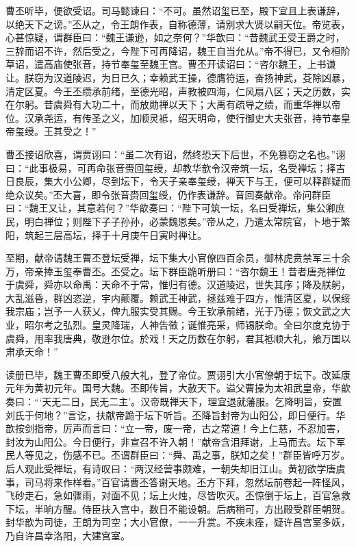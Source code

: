 曹丕听毕，便欲受诏。司马懿谏曰：“不可。虽然诏玺已至，殿下宜且上表谦辞，以绝天下之谤。”丕从之，令王朗作表，自称德薄，请别求大贤以嗣天位。帝览表，心甚惊疑，谓群臣曰：“魏王谦逊，如之奈何？”华歆曰：“昔魏武王受王爵之时，三辞而诏不许，然后受之，今陛下可再降诏，魏王自当允从。”帝不得已，又令桓阶草诏，遣高庙使张音，持节奉玺至魏王宫。曹丕开读诏曰：“咨尔魏王，上书谦让。朕窃为汉道陵迟，为日已久；幸赖武王操，德膺符运，奋扬神武，芟除凶暴，清定区夏。今王丕缵承前绪，至德光昭，声教被四海，仁风扇八区；天之历数，实在尔躬。昔虞舜有大功二十，而放勋禅以天下；大禹有疏导之绩，而重华禅以帝位。汉承尧运，有传圣之义，加顺灵袛，绍天明命，使行御史大夫张音，持节奉皇帝玺绶。王其受之！”

曹丕接诏欣喜，谓贾诩曰：“虽二次有诏，然终恐天下后世，不免篡窃之名也。”诩曰：“此事极易，可再命张音赍回玺绶，却教华歆令汉帝筑一坛，名受禅坛；择吉日良辰，集大小公卿，尽到坛下，令天子亲奉玺绶，禅天下与王，便可以释群疑而绝众议矣。”丕大喜，即令张音赍回玺绶，仍作表谦辞。音回奏献帝。帝问群臣曰：“魏王又让，其意若何？”华歆奏曰：“陛下可筑一坛，名曰受禅坛，集公卿庶民，明白禅位；则陛下子子孙孙，必蒙魏恩矣。”帝从之，乃遣太常院官，卜地于繁阳，筑起三层高坛，择于十月庚午日寅时禅让。

至期，献帝请魏王曹丕登坛受禅，坛下集大小官僚四百余员，御林虎贲禁军三十余万，帝亲捧玉玺奉曹丕。丕受之。坛下群臣跪听册曰：“咨尔魏王！昔者唐尧禅位于虞舜，舜亦以命禹：天命不于常，惟归有德。汉道陵迟，世失其序；降及朕躬，大乱滋昏，群凶恣逆，宇内颠覆。赖武王神武，拯兹难于四方，惟清区夏，以保绥我宗庙；岂予一人获乂，俾九服实受其赐。今王钦承前绪，光于乃德；恢文武之大业，昭尔考之弘烈。皇灵降瑞，人神告徵；诞惟亮采，师锡朕命。全曰尔度克协于虞舜，用率我唐典，敬逊尔位。於戏！天之历数在尔躬，君其袛顺大礼，飨万国以肃承天命！”

读册已毕，魏王曹丕即受八般大礼，登了帝位。贾诩引大小官僚朝于坛下。改延康元年为黄初元年。国号大魏。丕即传旨，大赦天下。谥父曹操为太祖武皇帝，华歆奏曰：“‘天无二日，民无二主’。汉帝既禅天下，理宜退就藩服。乞降明旨，安置刘氏于何地？”言讫，扶献帝跪于坛下听旨。丕降旨封帝为山阳公，即日便行。华歆按剑指帝，厉声而言曰：“立一帝，废一帝，古之常道！今上仁慈，不忍加害，封汝为山阳公。今日便行，非宣召不许入朝！”献帝含泪拜谢，上马而去。坛下军民人等见之，伤感不已。丕谓群臣曰：“舜、禹之事，朕知之矣！”群臣皆呼万岁。后人观此受禅坛，有诗叹曰：“两汉经营事颇难，一朝失却旧江山。黄初欲学唐虞事，司马将来作样看。”百官请曹丕答谢天地。丕方下拜，忽然坛前卷起一阵怪风，飞砂走石，急如骤雨，对面不见；坛上火烛，尽皆吹灭。丕惊倒于坛上，百官急救下坛，半晌方醒。侍臣扶入宫中，数日不能设朝。后病稍可，方出殿受群臣朝贺。封华歆为司徒，王朗为司空；大小官僚，一一升赏。不疾未痊，疑许昌宫室多妖，乃自许昌幸洛阳，大建宫室。

